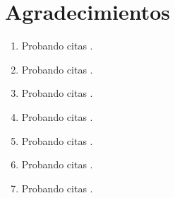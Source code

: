 

\chapter*{Agradecimientos} 

\lipsum[7]

\begin{enumerate}
\item Probando citas \cite{bentley:1999}.
\item Probando citas \cite{bringhurst:2002} .
\item Probando citas \cite{cormen:2001} .
\item Probando citas \cite{dueck:trio} .
\item Probando citas \cite{knuth:1976} .
\item Probando citas \cite{knuth:1974} .
\item Probando citas \cite{sommerville:1992} .
\end{enumerate}
